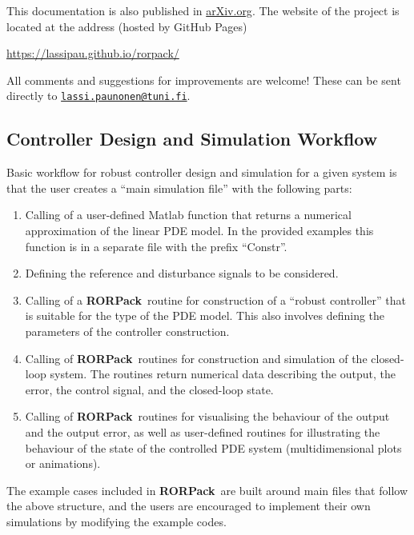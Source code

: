 \documentclass[11pt, a4paper]{amsart}
\theoremstyle{definition}
\numberwithin{equation}{section}
\newcommand{\RORname}{\textbf{RORPack}}
\begin{document}
  This documentation is also published in \href{https://arxiv.org/}{arXiv.org}.
The website of the project is located at the address (hosted by GitHub Pages)
\begin{center}
  \href{https://lassipau.github.io/rorpack/}{https://lassipau.github.io/rorpack/}
\end{center}
All comments and suggestions for improvements are welcome! These can be sent directly to \texttt{\href{mailto:lassi.paunonen@tuni.fi}{lassi.paunonen@tuni.fi}}.

\subsection{Controller Design and Simulation Workflow}

Basic workflow for robust controller design and simulation for a given system is that the user creates a ``main simulation file'' with the following parts:
\begin{enumerate}
  \item Calling of a user-defined Matlab function that returns a numerical approximation of the linear PDE model. In the provided examples this function is in a separate file with the prefix ``Constr''.
  \item Defining the reference and disturbance signals to be considered.
  \item Calling of a \RORname\ routine for construction of a ``robust controller'' that is suitable for the type of the PDE model.
    This also involves defining the parameters of the controller construction.
  \item Calling of \RORname\ routines for construction and simulation of the closed-loop system. The routines return numerical data describing the output, the error, the control signal, and the closed-loop state.
  \item Calling of \RORname\ routines for visualising the behaviour of the output and the output error, as well as 
    user-defined routines for illustrating the behaviour of the state of the controlled PDE system (multidimensional plots or animations).
\end{enumerate}
The example cases included in \RORname\ are built around main files that follow the above structure, and the users are encouraged to implement their own simulations by modifying the example codes.
\end{document}

